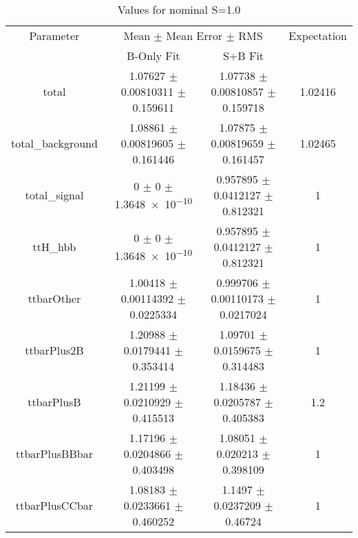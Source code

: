 \begin{table}
\centering
\caption{Values for nominal S=1.0}
\begin{tabular}{cccc}
\toprule
Parameter & \multicolumn{2}{c}{Mean $\pm$ Mean Error $\pm$ RMS} & Expectation\\
 & B-Only Fit & S+B Fit & \\
\midrule
total & \num{1.07627} $\pm$ \num{0.00810311} $\pm$ \num{0.159611} & \num{1.07738} $\pm$ \num{0.00810857} $\pm$ \num{0.159718} & \num{1.02416}\\
total\_background & \num{1.08861} $\pm$ \num{0.00819605} $\pm$ \num{0.161446} & \num{1.07875} $\pm$ \num{0.00819659} $\pm$ \num{0.161457} & \num{1.02465}\\
total\_signal & \num{0} $\pm$ \num{0} $\pm$ \num{1.3648e-10} & \num{0.957895} $\pm$ \num{0.0412127} $\pm$ \num{0.812321} & \num{1}\\
ttH\_hbb & \num{0} $\pm$ \num{0} $\pm$ \num{1.3648e-10} & \num{0.957895} $\pm$ \num{0.0412127} $\pm$ \num{0.812321} & \num{1}\\
ttbarOther & \num{1.00418} $\pm$ \num{0.00114392} $\pm$ \num{0.0225334} & \num{0.999706} $\pm$ \num{0.00110173} $\pm$ \num{0.0217024} & \num{1}\\
ttbarPlus2B & \num{1.20988} $\pm$ \num{0.0179441} $\pm$ \num{0.353414} & \num{1.09701} $\pm$ \num{0.0159675} $\pm$ \num{0.314483} & \num{1}\\
ttbarPlusB & \num{1.21199} $\pm$ \num{0.0210929} $\pm$ \num{0.415513} & \num{1.18436} $\pm$ \num{0.0205787} $\pm$ \num{0.405383} & \num{1.2}\\
ttbarPlusBBbar & \num{1.17196} $\pm$ \num{0.0204866} $\pm$ \num{0.403498} & \num{1.08051} $\pm$ \num{0.020213} $\pm$ \num{0.398109} & \num{1}\\
ttbarPlusCCbar & \num{1.08183} $\pm$ \num{0.0233661} $\pm$ \num{0.460252} & \num{1.1497} $\pm$ \num{0.0237209} $\pm$ \num{0.46724} & \num{1}\\
\bottomrule
\end{tabular}
\end{table}